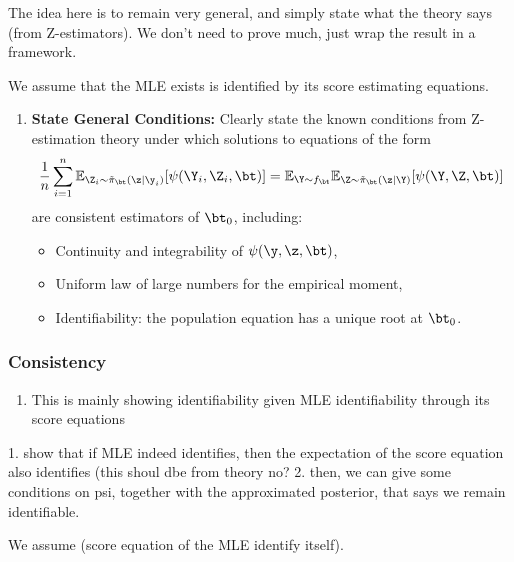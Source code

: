 \begin{tcolorbox}[colback=yellow!5!white,colframe=yellow!60!black,title=First Objective: Write the General Case Conditions]
The idea here is to remain very general, and simply state what the theory says (from Z-estimators). We don't need to prove much, just wrap the result in a framework.

We assume that the MLE exists is identified by its score estimating equations.

\begin{enumerate}
    \item \textbf{State General Conditions:} Clearly state the known conditions from Z-estimation theory under which solutions to equations of the form
    \[
    \frac{1}{n} \sum_{i=1}^n \mathbb{E}_{\Z_i \sim \tilde\pi_\bt(\z \mid \y_i)}[\psi(\Y_i, \Z_i, \bt)] 
    = 
    \mathbb{E}_{\Y \sim f_\bt} \mathbb{E}_{\Z \sim \tilde\pi_\bt(\z \mid \Y)}[\psi(\Y, \Z, \bt)]
    \]
    are consistent estimators of \( \bt_0 \), including:
    \begin{itemize}
        \item Continuity and integrability of \( \psi(\y, \z, \bt) \),
        \item Uniform law of large numbers for the empirical moment,
        \item Identifiability: the population equation has a unique root at \( \bt_0 \).
    \end{itemize}
\end{enumerate}
\end{tcolorbox}

\subsubsection{Consistency}
\begin{enumerate}
    \item This is mainly showing identifiability given MLE identifiability through its score equations
\end{enumerate}

1. show that if MLE indeed identifies, then the expectation of the score equation also identifies (this shoul dbe from theory no?
2. then, we can give some conditions on psi, together with the approximated posterior, that says we remain identifiable.

We assume (score equation of the MLE identify itself).

